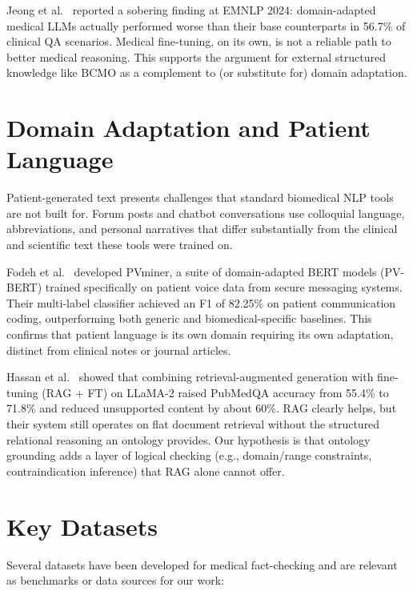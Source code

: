 \documentclass[11pt,a4paper]{article}
\begin{document}
Jeong et al.~\cite{jeong2024limited} reported a sobering finding at EMNLP 2024: domain-adapted medical LLMs actually performed worse than their base counterparts in 56.7\% of clinical QA scenarios. Medical fine-tuning, on its own, is not a reliable path to better medical reasoning. This supports the argument for external structured knowledge like BCMO as a complement to (or substitute for) domain adaptation.

\section{Domain Adaptation and Patient Language}

Patient-generated text presents challenges that standard biomedical NLP tools are not built for. Forum posts and chatbot conversations use colloquial language, abbreviations, and personal narratives that differ substantially from the clinical and scientific text these tools were trained on.

Fodeh et al.~\cite{fodeh2026pvminer} developed PVminer, a suite of domain-adapted BERT models (PV-BERT) trained specifically on patient voice data from secure messaging systems. Their multi-label classifier achieved an F1 of 82.25\% on patient communication coding, outperforming both generic and biomedical-specific baselines. This confirms that patient language is its own domain requiring its own adaptation, distinct from clinical notes or journal articles.

Hassan et al.~\cite{hassan2025ragft} showed that combining retrieval-augmented generation with fine-tuning (RAG + FT) on LLaMA-2 raised PubMedQA accuracy from 55.4\% to 71.8\% and reduced unsupported content by about 60\%. RAG clearly helps, but their system still operates on flat document retrieval without the structured relational reasoning an ontology provides. Our hypothesis is that ontology grounding adds a layer of logical checking (e.g., domain/range constraints, contraindication inference) that RAG alone cannot offer.

\section{Key Datasets}

Several datasets have been developed for medical fact-checking and are relevant as benchmarks or data sources for our work:
\end{document}
